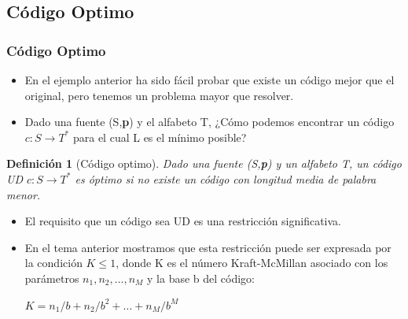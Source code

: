 \documentclass{beamer}
\newtheorem{definicion} [Definicion]{Definición}
\begin{document}
\subsection{Código Optimo}
\begin{frame} \frametitle{Código Optimo} \small

\begin{itemize}
\item En el ejemplo anterior ha sido fácil probar que existe un código mejor que el original, pero tenemos un problema mayor que resolver. 

\item Dado una fuente (S,\textbf{p}) y el alfabeto T, ¿Cómo podemos encontrar un código $c: S\rightarrow T^{*}$ para el cual L es el mínimo posible?

\end{itemize}

\begin{definicion}[Código optimo]
Dado una fuente (S,\textbf{p}) y un alfabeto T, un código UD $c: S\rightarrow T^{*}$  es óptimo si no existe un código con longitud media de palabra menor.
\end{definicion}

\begin{itemize}
\item El requisito que un código sea UD es una restricción significativa.  

\item En el tema anterior mostramos que esta restricción puede ser expresada por la condición $K\leq 1$, donde K es el número  Kraft-McMillan asociado con los parámetros $n_1,n_2,...,n_M$ y la base b del código: 
\begin{center}
    $K=n_1/b +n_2/b^2 + \ldots +n_M / b^M$ 
\end{center}

\end{itemize}

\end{frame} 
\end{document}
